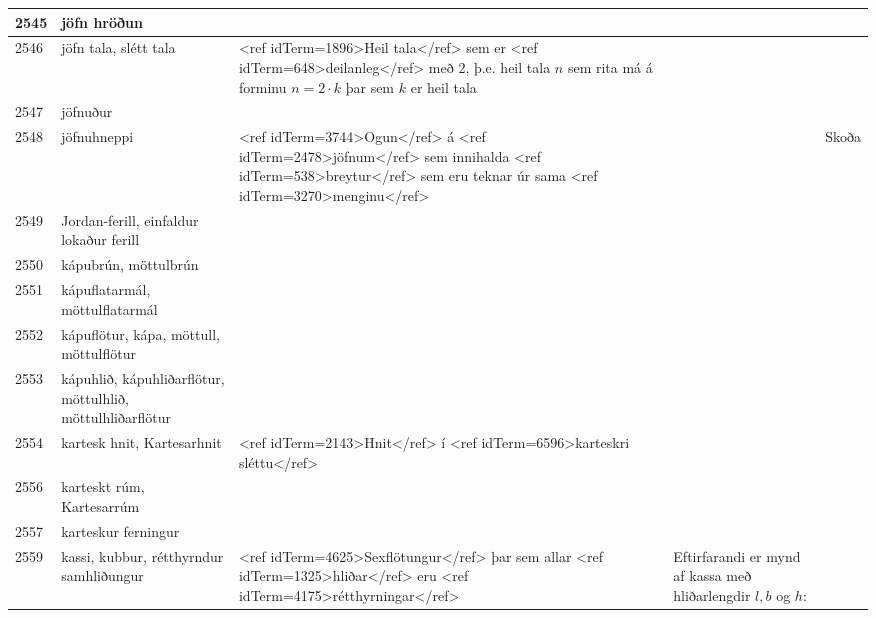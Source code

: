 \begin{longtable}{p{}|p{}|p{}|p{}|p{}}
\hline
2545 & jöfn hröðun &  &  &  \\
\hline
2546 & jöfn tala, slétt tala & <ref idTerm=1896>Heil tala</ref> sem er <ref idTerm=648>deilanleg</ref> með $2$, þ.e. heil tala $n$ sem rita má á forminu $n = 2 \cdot k$ þar sem $k$ er heil tala &  & \\
\hline
2547 & jöfnuður &  &  &  \\
\hline
2548 & jöfnuhneppi & <ref idTerm=3744>Ogun</ref> á <ref idTerm=2478>jöfnum</ref> sem innihalda <ref idTerm=538>breytur</ref> sem eru teknar úr sama <ref idTerm=3270>menginu</ref> &  & Skoða \\
\hline
2549 & Jordan-ferill, einfaldur lokaður ferill &  &  &  \\
\hline
2550 & kápubrún, möttulbrún &  &  &  \\
\hline
2551 & kápuflatarmál, möttulflatarmál &  &  &  \\
\hline
2552 & kápuflötur, kápa, möttull, möttulflötur &  &  &  \\
\hline
2553 & kápuhlið, kápuhliðarflötur, möttulhlið, möttulhliðarflötur &  &  &  \\
\hline
2554 & kartesk hnit, Kartesarhnit & <ref idTerm=2143>Hnit</ref> í <ref idTerm=6596>karteskri sléttu</ref> & & \\
\hline
2556 & karteskt rúm, Kartesarrúm &  &  &  \\
\hline
2557 & karteskur ferningur &  &  &  \\
\hline
2559 & kassi, kubbur, rétthyrndur samhliðungur & <ref idTerm=4625>Sexflötungur</ref> þar sem allar <ref idTerm=1325>hliðar</ref> eru <ref idTerm=4175>rétthyrningar</ref> & Eftirfarandi er mynd af kassa með hliðarlengdir $l,b$ og $h$:


\end{longtable}

